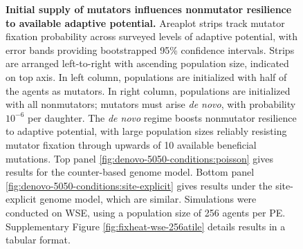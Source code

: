 \begin{figure}[h]
  \begin{minipage}{\textwidth}
    \caption{%
      \textbf{Initial supply of mutators influences nonmutator resilience to available adaptive potential.}
      \footnotesize
      Areaplot strips track mutator fixation probability across surveyed levels of adaptive potential, with error bands providing bootstrapped 95\% confidence intervals.
      Strips are arranged left-to-right with ascending population size, indicated on top axis.
      In left column, populations are initialized with half of the agents as mutators.
      In right column, populations are initialized with all nonmutators; mutators must arise \textit{de novo}, with probability $10^{-6}$ per daughter.
      The \textit{de novo} regime boosts nonmutator resilience to adaptive potential, with large population sizes reliably resisting mutator fixation through upwards of 10 available beneficial mutations.
      Top panel \ref{fig:denovo-5050-conditions:poisson} gives results for the counter-based genome model.
      Bottom panel \ref{fig:denovo-5050-conditions:site-explicit} gives results under the site-explicit genome model, which are similar.
      Simulations were conducted on WSE, using a population size of 256 agents per PE.
      Supplementary Figure \ref{fig:fixheat-wse-256atile} details results in a tabular format.
    }
    \label{fig:denovo-5050-conditions}
  \end{minipage}
\end{figure}
